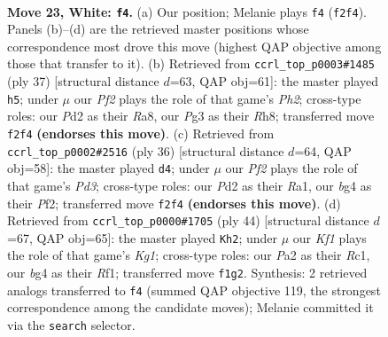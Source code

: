 \documentclass[11pt]{article}
\begin{document}
\clearpage

\begin{figure}[p]\centering
\begin{subfigure}{0.46\textwidth}\centering
\resizebox{\linewidth}{!}{%
\newchessgame
\chessboard[
  setfen={1r3r2/pp4k1/6pp/2pB3n/3bp1bP/N5P1/PP1P1P2/1RB1RK2 w - - 4 23},
  showmover=false,
  pgfstyle=straightmove, color=movearrow, markmove={f2-f4}
]}
\caption{}
\end{subfigure}\hfill
\begin{subfigure}{0.46\textwidth}\centering
\resizebox{\linewidth}{!}{%
\newchessgame
\chessboard[
  setfen={r3k2r/1b1p1npp/p2bp3/1p6/3NP3/4BP2/PPP3P1/2KR1B1R b kq - 6 19},
  showmover=false,
  pgfstyle=straightmove, color=movearrow, markmove={h7-h5}
]}
\caption{}
\end{subfigure}
\\[4pt]
\begin{subfigure}{0.46\textwidth}\centering
\resizebox{\linewidth}{!}{%
\newchessgame
\chessboard[
  setfen={2kr3r/1p3pp1/p1n1b3/2B1p2p/6P1/2PP3P/P4PB1/R2R2K1 w - - 0 19},
  showmover=false,
  pgfstyle=straightmove, color=movearrow, markmove={d3-d4}
]}
\caption{}
\end{subfigure}\hfill
\begin{subfigure}{0.46\textwidth}\centering
\resizebox{\linewidth}{!}{%
\newchessgame
\chessboard[
  setfen={2r1k2r/pb1pp1b1/4n3/1p3p2/1P2P3/1BP1B1Pp/P2N1P2/2R2RK1 w k - 0 23},
  showmover=false,
  pgfstyle=straightmove, color=movearrow, markmove={g1-h2}
]}
\caption{}
\end{subfigure}
\caption{\textbf{Move 23, White: \texttt{f4}.} (a) Our position; Melanie plays \texttt{f4} (\texttt{f2f4}). Panels (b)--(d) are the retrieved master positions whose correspondence most drove this move (highest QAP objective among those that transfer to it). (b) Retrieved from \texttt{ccrl\_top\_p0003\#1485} (ply 37) [structural distance $d$=63, QAP obj=61]: the master played \texttt{h5}; under $\mu$ our \emph{Pf2} plays the role of that game's \emph{Ph2}; cross-type roles: our \emph{P}d2 as their \emph{R}a8, our \emph{P}g3 as their \emph{R}h8; transferred move \texttt{f2f4} \textbf{(endorses this move)}. (c) Retrieved from \texttt{ccrl\_top\_p0002\#2516} (ply 36) [structural distance $d$=64, QAP obj=58]: the master played \texttt{d4}; under $\mu$ our \emph{Pf2} plays the role of that game's \emph{Pd3}; cross-type roles: our \emph{P}d2 as their \emph{R}a1, our \emph{b}g4 as their \emph{P}f2; transferred move \texttt{f2f4} \textbf{(endorses this move)}. (d) Retrieved from \texttt{ccrl\_top\_p0000\#1705} (ply 44) [structural distance $d$=67, QAP obj=65]: the master played \texttt{Kh2}; under $\mu$ our \emph{Kf1} plays the role of that game's \emph{Kg1}; cross-type roles: our \emph{P}a2 as their \emph{R}c1, our \emph{b}g4 as their \emph{R}f1; transferred move \texttt{f1g2}. Synthesis: 2 retrieved analogs transferred to \texttt{f4} (summed QAP objective 119, the strongest correspondence among the candidate moves); Melanie committed it via the \texttt{search} selector.}
\label{fig:thought-m44}
\end{figure}
\end{document}
